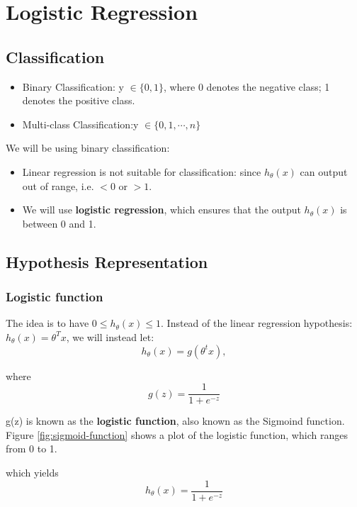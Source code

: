\section{Logistic Regression}

    \subsection{Classification}
        
        \begin{itemize}
            \item Binary Classification: y $\in \{0, 1\}$, where 0 denotes the negative class; 1 denotes the positive class.
            \item Multi-class Classification:y $\in \{0, 1, \cdots, n\}$ 
        \end{itemize}

        We will be using binary classification: 
        \begin{itemize}
            \item Linear regression is not suitable for classification: since $h_\theta (x)$ can output out of range, i.e. $<0$ or $>1$. 
            \item We will use \textbf{logistic regression}, which ensures that the output $h_\theta (x)$ is between 0 and 1.
        \end{itemize}

    \subsection{Hypothesis Representation}

        \subsubsection{Logistic function}
            The idea is to have $ 0 \leq h_\theta (x) \leq 1$. Instead of the linear regression hypothesis: $h_\theta (x) = \theta^T x$, we will instead let:
                \[
                    h_\theta (x) = g (\theta^t x)
                ,\]

                where \[
                    g(z) = \frac{1}{1+e^{-z}}
                \]

                g(z) is known as the \textbf{logistic function}, also known as the Sigmoind function. Figure \ref{fig:sigmoid-function} shows a plot of the logistic function, which ranges from 0 to 1. 


                which yields 
                \begin{equation}
                    h_\theta (x) = \frac{1}{1+e^{-z}}
                    \label{eq:log-reg-hypo}
                \end{equation}


